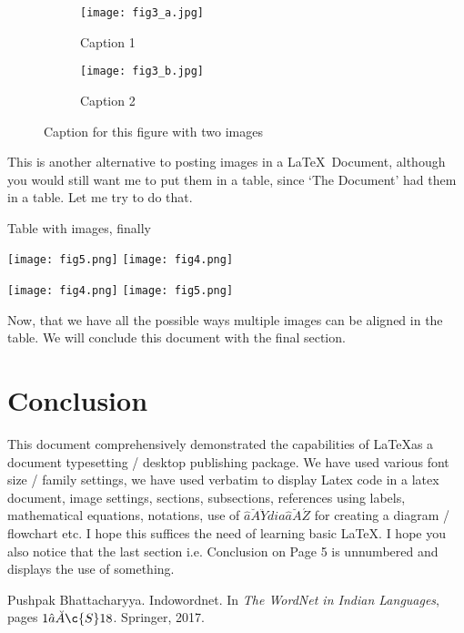 \documentclass[15pt,a4paper]{article}
\begin{document}
\begin{figure}
    \centering
    \begin{subfigure}[b]{0.4\textwidth}
        \centering
        \texttt{[image: fig3\_a.jpg]}
        \caption{Caption 1}
    \end{subfigure}
    \hfill
    \begin{subfigure}[b]{0.4\textwidth}
        \centering
        \texttt{[image: fig3\_b.jpg]}
        \caption{Caption 2}
    \end{subfigure}
    \caption{Caption for this figure with two images}
\end{figure}

\fontsize{11}{12.5}\selectfont
This is another alternative to posting images in a \LaTeX \ Document, although you would still want me to put them in a table, since ‘The Document’
had them in a table. Let me try to do that.

\vspace{5mm}
\begin{table}[htb]
    \caption{Table with images, finally}
    \texttt{[image: fig5.png]}%
    \hspace*{\fill}%
    \texttt{[image: fig4.png]}

    \texttt{[image: fig4.png]}%
    \hspace*{\fill}%
    \texttt{[image: fig5.png]}
\end{table}

Now, that we have all the possible ways multiple images can be aligned in
the table. We will conclude this document with the final section.

\newpage

\section*{Conclusion}
This document comprehensively demonstrated the capabilities of \LaTeX as a
document typesetting / desktop publishing package. We have used various
font size / family settings, we have used verbatim to display Latex code
in a latex document, image settings, sections, subsections, references using
labels, mathematical equations, notations, use of $\hat{a}\breve{A}\ddot{Y}dia\hat{a}\breve{A}\acute{Z}$ for creating
a diagram / flowchart etc.  I hope this suffices the need of learning basic \LaTeX. I hope you also notice that the last section i.e. Conclusion on Page
5 is unnumbered and displays the use of something.


\begin{thebibliography}{9}
Pushpak Bhattacharyya. Indowordnet. In 
\textit{The WordNet in Indian Languages}, 
pages $1\hat{a}\Breve{A}{{\c{S}}}18$.  Springer, 2017.
\end{thebibliography}
\end{document}
